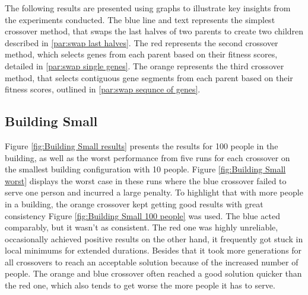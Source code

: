 
The following results are presented using graphs to illustrate key insights from the experiments conducted. The blue line and text represents the simplest crossover method, that swaps the last halves of two parents to create two children described in \ref{par:swap last halves}. The red represents the second crossover method, which selects genes from each parent based on their fitness scores, detailed in \ref{par:swap single genes}. The orange represents the third crossover method, that selects contiguous gene segments from each parent based on their fitness scores, outlined in \ref{par:swap sequnce of genes}.

\subsection{Building Small}
Figure \ref{fig:Building Small results} presents the results for 100 people in the building, as well as the worst performance from five runs for each crossover on the smallest building configuration with 10 people. Figure \ref{fig:Building Small worst} displays the worst case in these runs where the blue crossover failed to serve one person and incurred a large penalty. To highlight that with more people in a building, the orange crossover kept getting good results with great consistency Figure \ref{fig:Building Small 100 people} was used. The blue acted comparably, but it wasn't as consistent. The red one was highly unreliable, occasionally achieved positive results on the other hand, it frequently got stuck in local minimums for extended durations. Besides that it took more generations for all crossovers to reach an acceptable solution because of the increased number of people. The orange and blue crossover often reached a good solution quicker than the red one, which also tends to get worse the more people it has to serve.

